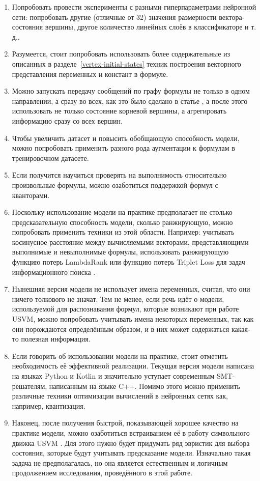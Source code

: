 \begin{enumerate}
    \item Попробовать провести эксперименты с разными гиперпараметрами нейронной сети: попробовать другие (отличные от 32) значения размерности вектора-состояния вершины, другое количество линейных слоёв в классификаторе и т. д..
    \item Разумеется, стоит попробовать использовать более содержательные из описанных в разделе~\ref{vertex-initial-states} техник построения векторного представления переменных и констант в формуле.
    \item Можно запускать передачу сообщений по графу формулы не только в одном направлении, а сразу во всех, как это было сделано в статье \cite{gnn-for-scheduling-paper}, а после этого использовать не только состояние корневой вершины, а агрегировать информацию сразу со всех вершин.
    \item Чтобы увеличить датасет и повысить обобщающую способность модели, можно попробовать применить разного рода аугментации к формулам в тренировочном датасете.
    \item Если получится научиться проверять на выполнимость относительно произвольные формулы, можно озаботиться поддержкой формул с кванторами.
    \item Поскольку использование модели на практике предполагает не столько предсказательную способность модели, сколько ранжирующую, можно попробовать применить техники из этой области. Например: учитывать косинусное расстояние между вычисляемыми векторами, представляющими выполнимые и невыполнимые формулы, использовать ранжирующую функцию потерь LambdaRank \cite{lambda-rank-paper} или функцию потерь Triplet Loss для задач информационного поиска \cite{triplet-loss-paper-1} \cite{triplet-loss-paper-2}.
    \item Нынешняя версия модели не использует имена переменных, считая, что они ничего толкового не значат. Тем не менее, если речь идёт о модели, используемой для распознавания формул, которые возникают при работе USVM, можно попробовать учитывать имена некоторых переменных, так как они порождаются определённым образом, и в них может содержаться какая-то полезная информация.
    \item Если говорить об использовании модели на практике, стоит отметить необходимость её эффективной реализации. Текущая версия модели написана на языках Python и Kotlin и значительно уступает современным SMT-решателям, написанным на языке C++. Помимо этого можно применить различные техники оптимизации вычислений в нейронных сетях как, например, квантизация.
    \item Наконец, после получения быстрой, показывающей хорошее качество на практике модели, можно озаботиться встраиванием её в работу символьного движка USVM \cite{usvm-diploma}. Для этого нужно будет придумать ряд эвристик для выбора состояния, которые будут учитывать предсказание модели. Изначально такая задача не предполагалась, но она является естественным и логичным продолжением исследования, проведённого в этой работе.
\end{enumerate}
